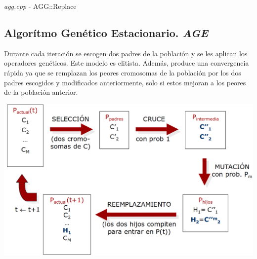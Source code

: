 \documentclass[a4paper, 12pt]{article}
\begin{document}
      \begin{algorithm}[H]
       	\caption{\textit{agg.cpp} - AGG::Replace}
       	
      \end{algorithm}
      
      
      
      
      
      
      \newpage
      \subsection{Algorítmo Genético Estacionario. \textit{AGE}}
      Durante cada iteración se escogen dos padres de la población y se les aplican los operadores genéticos. Este modelo es elitista. Además, produce una convergencia rápida ya que se remplazan los peores cromosomas de la población por los dos padres escogidos y modificados anteriormente, solo si estos mejoran a los peores de la población anterior.
      \begin{center}
      	\includegraphics[scale=0.3]{esquema-age}
      \end{center}
      
\end{document}
